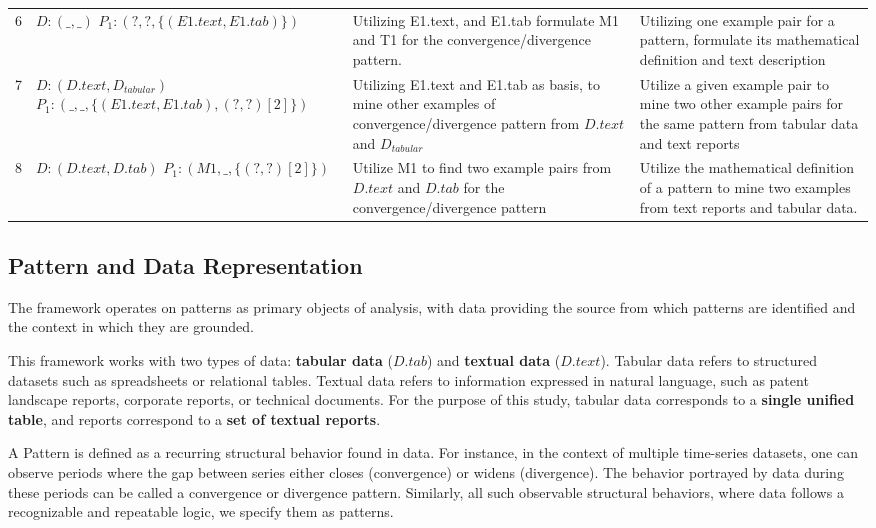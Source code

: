 \documentclass[sigconf,nonacm,anonymous]{acmart}
\begin{document}
\begin{table}[t]
\begin{tabular}{c|p{}|p{}|p{}}
6 & 
$D: (\_, \_)$ \newline
$P_1 : (?, ?, \{(E1.text, E1.tab)\})$
& Utilizing E1.text, and E1.tab formulate M1 and T1 for the convergence/divergence pattern.
& Utilizing one example pair for a pattern, formulate its mathematical definition and text description\\

7 & 
$D: (D.text, D_{tabular})$ \newline
$P_1 : (\_, \_, \{(E1.text, E1.tab),(?,?)[2] \})$
& Utilizing E1.text and E1.tab as basis, to mine other examples of convergence/divergence pattern from $D.text$ and $D_{tabular}$ 
& Utilize a given example pair to mine two other example pairs for the same pattern from tabular data and text reports\\

8 & 
$D: (D.text, D.tab)$ \newline
$P_1 : (M1, \_, \{(?,?)[2] \})$
& Utilize M1 to find two example pairs from $D.text$ and $D.tab$ for the convergence/divergence pattern
& Utilize the mathematical definition of a pattern to mine two examples from text reports and tabular data.\\

\hline
\end{tabular}
\end{table}

\subsection{Pattern and Data Representation}

The framework operates on patterns as primary objects of analysis, with data providing the source from which patterns are identified and the context in which they are grounded.

This framework works with two types of data: \textbf{tabular data} ($D.tab$) and \textbf{textual data} ($D.text$). Tabular data refers to structured datasets such as spreadsheets or relational tables. Textual data refers to information expressed in natural language, such as patent landscape reports, corporate reports, or technical documents. For the purpose of this study, tabular data corresponds to a \textbf{single unified table}, and reports correspond to a \textbf{set of textual reports}.

A Pattern is defined as a recurring structural behavior found in data. For instance, in the context of multiple time-series datasets, one can observe periods where the gap between series either closes (convergence) or widens (divergence). The behavior portrayed by data during these periods can be called a convergence or divergence pattern. Similarly, all such observable structural behaviors, where data follows a recognizable and repeatable logic, we specify them as patterns.
\end{document}
